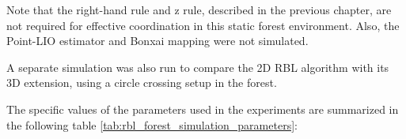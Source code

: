             Note that the right-hand rule and z rule, described in the previous chapter, are not required for effective coordination in this static forest environment.
            Also, the \ac{Point-LIO} estimator and Bonxai mapping were not simulated.

            A separate simulation was also run to compare the 2D \ac{RBL} algorithm with its 3D extension, using a circle crossing setup in the forest.

            The specific values of the parameters used in the experiments are summarized in the following table \ref{tab:rbl_forest_simulation_parameters}:



